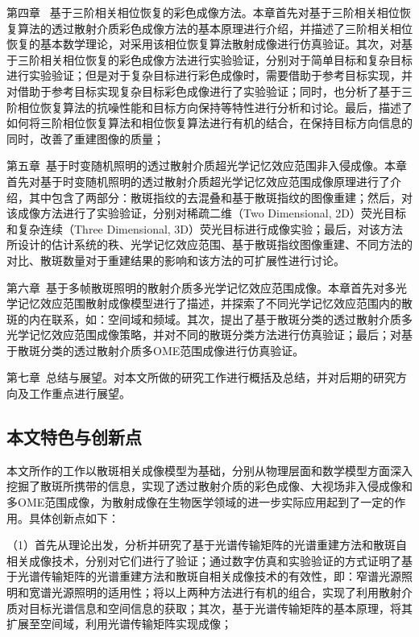 第四章 \ 基于三阶相关相位恢复的彩色成像方法。本章首先对基于三阶相关相位恢复算法的透过散射介质彩色成像方法的基本原理进行介绍，并描述了三阶相关相位恢复的基本数学理论，对采用该相位恢复算法散射成像进行仿真验证。其次，对基于三阶相关相位恢复的彩色成像方法进行实验验证，分别对于简单目标和复杂目标进行实验验证；但是对于复杂目标进行彩色成像时，需要借助于参考目标实现，并对借助于参考目标实现复杂目标彩色成像进行了实验验证；同时，也分析了基于三阶相位恢复算法的抗噪性能和目标方向保持等特性进行分析和讨论。最后，描述了如何将三阶相位恢复算法和相位恢复算法进行有机的结合，在保持目标方向信息的同时，改善了重建图像的质量；

第五章\  基于时变随机照明的透过散射介质超光学记忆效应范围非入侵成像。本章首先对基于时变随机照明的透过散射介质超光学记忆效应范围成像原理进行了介绍，其中包含了两部分：散斑指纹的去混叠和基于散斑指纹的图像重建；然后，对该成像方法进行了实验验证，分别对稀疏二维（Two Dimensional, 2D）荧光目标和复杂连续（Three Dimensional, 3D）荧光目标进行成像实验；最后，对该方法所设计的估计系统的秩、光学记忆效应范围、基于散斑指纹图像重建、不同方法的对比、散斑数量对于重建结果的影响和该方法的可扩展性进行讨论。

第六章\ 基于多帧散斑照明的散射介质多光学记忆效应范围成像。本章首先对多光学记忆效应范围散射成像模型进行了描述，并探索了不同光学记忆效应范围内的散斑的内在联系，如：空间域和频域。其次，提出了基于散斑分类的透过散射介质多光学记忆效应范围成像策略，并对不同的散斑分类方法进行仿真验证；最后；对基于散斑分类的透过散射介质多OME范围成像进行仿真验证。

第七章\ 总结与展望。对本文所做的研究工作进行概括及总结，并对后期的研究方向及工作重点进行展望。

\subsection{本文特色与创新点}

本文所作的工作以散斑相关成像模型为基础，分别从物理层面和数学模型方面深入挖掘了散斑所携带的信息，实现了透过散射介质的彩色成像、大视场非入侵成像和多OME范围成像，为散射成像在生物医学领域的进一步实际应用起到了一定的作用。具体创新点如下：

（1）首先从理论出发，分析并研究了基于光谱传输矩阵的光谱重建方法和散斑自相关成像技术，分别对它们进行了验证；通过数字仿真和实验验证的方式证明了基于光谱传输矩阵的光谱重建方法和散斑自相关成像技术的有效性，即：窄谱光源照明和宽谱光源照明的适用性；将以上两种方法进行有机的组合，实现了利用散射介质对目标光谱信息和空间信息的获取；其次，基于光谱传输矩阵的基本原理，将其扩展至空间域，利用光谱传输矩阵实现成像；

